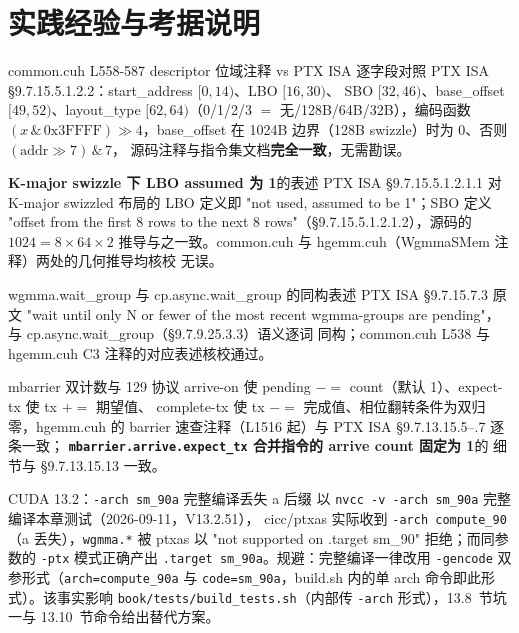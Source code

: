 \section{实践经验与考据说明}

\begin{kaogu}[F2 核校通过]{common.cuh L558-587 descriptor 位域注释 vs PTX ISA}
  逐字段对照 PTX ISA §9.7.15.5.1.2.2：start\_address $[0,14)$、LBO $[16,30)$、
  SBO $[32,46)$、base\_offset $[49,52)$、layout\_type $[62,64)$（0/1/2/3 $=$
  无/128B/64B/32B），编码函数 $(x \,\&\, \mathrm{0x3FFFF}) \gg 4$，base\_offset
  在 1024B 边界（128B swizzle）时为 0、否则 $(\mathrm{addr} \gg 7) \,\&\, 7$，
  源码注释与指令集文档\textbf{完全一致}，无需勘误。
\end{kaogu}

\begin{kaogu}[F2 核校通过]{\textbf{K-major swizzle 下 LBO assumed 为 1}的表述}
  PTX ISA §9.7.15.5.1.2.1.1 对 K-major swizzled 布局的 LBO 定义即
  "not used, assumed to be 1"；SBO 定义 "offset from the first 8 rows to the
  next 8 rows"（§9.7.15.5.1.2.1.2），源码的 $1024 = 8 \times 64 \times 2$
  推导与之一致。common.cuh 与 hgemm.cuh（WgmmaSMem 注释）两处的几何推导均核校
  无误。
\end{kaogu}

\begin{kaogu}[F2 核校通过]{wgmma.wait\_group 与 cp.async.wait\_group 的同构表述}
  PTX ISA §9.7.15.7.3 原文 "wait until only N or fewer of the most recent
  wgmma-groups are pending"，与 cp.async.wait\_group（§9.7.9.25.3.3）语义逐词
  同构；common.cuh L538 与 hgemm.cuh C3 注释的对应表述核校通过。
\end{kaogu}

\begin{kaogu}[F2 核校通过]{mbarrier 双计数与 129 协议}
  arrive-on 使 pending $-=$ count（默认 1）、expect-tx 使 tx $+=$ 期望值、
  complete-tx 使 tx $-=$ 完成值、相位翻转条件为双归零，hgemm.cuh 的
  barrier 速查注释（L1516 起）与 PTX ISA §9.7.13.15.5--.7 逐条一致；
  \textbf{\texttt{mbarrier.\allowbreak{}arrive.\allowbreak{}expect\_\allowbreak{}tx} 合并指令的 arrive count 固定为 1}的
  细节与 §9.7.13.15.13 一致。
\end{kaogu}

\begin{kaogu}[F1·工具链实测]{CUDA 13.2：\texttt{-arch sm\_90a} 完整编译丢失 a 后缀}
  以 \texttt{nvcc -v -arch sm\_90a} 完整编译本章测试（2026-09-11，V13.2.51），
  cicc/ptxas 实际收到 \texttt{-arch compute\_90}（a 丢失），\texttt{wgmma.*}
  被 ptxas 以 "not supported on .target sm\_90" 拒绝；而同参数的 \texttt{-ptx}
  模式正确产出 \texttt{.target sm\_90a}。规避：完整编译一律改用
  \texttt{-gencode} 双参形式（\texttt{arch=\allowbreak{}compute\_\allowbreak{}90a} 与
  \texttt{code=sm\_90a}，build.sh 内的单 arch 命令即此形式）。该事实影响 \texttt{book/\allowbreak{}tests/\allowbreak{}build\_\allowbreak{}tests.\allowbreak{}sh}（内部传 \texttt{-arch}
  形式），13.8~节坑一与 13.10~节命令给出替代方案。
\end{kaogu}

